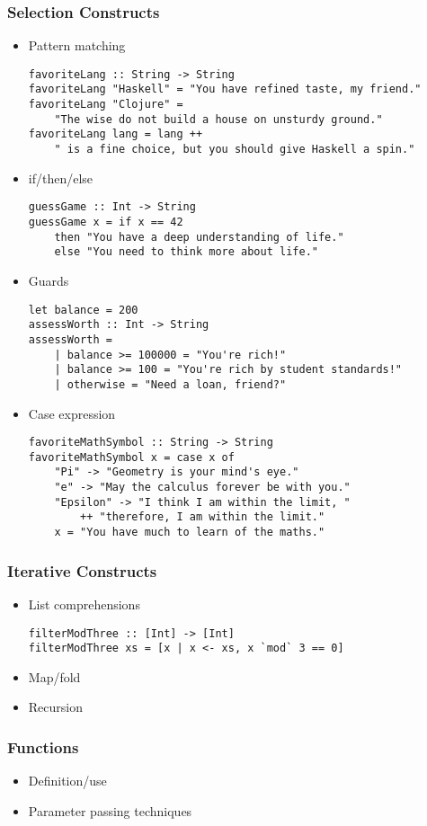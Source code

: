\documentclass[titlepage,12pt]{article}
\newcommand{\bi}{\begin{itemize}}
\newcommand{\ei}{\end{itemize}}
\begin{document}
\subsubsection{Selection Constructs}
\bi
    \item Pattern matching
\begin{verbatim}
favoriteLang :: String -> String
favoriteLang "Haskell" = "You have refined taste, my friend."
favoriteLang "Clojure" = 
    "The wise do not build a house on unsturdy ground."
favoriteLang lang = lang ++ 
    " is a fine choice, but you should give Haskell a spin."
\end{verbatim}
    \item if/then/else
\begin{verbatim}
guessGame :: Int -> String
guessGame x = if x == 42
    then "You have a deep understanding of life."
    else "You need to think more about life."
\end{verbatim}
    \item Guards
\begin{verbatim}
let balance = 200
assessWorth :: Int -> String
assessWorth =
    | balance >= 100000 = "You're rich!"
    | balance >= 100 = "You're rich by student standards!"
    | otherwise = "Need a loan, friend?"
\end{verbatim}
    \item Case expression
\begin{verbatim}
favoriteMathSymbol :: String -> String
favoriteMathSymbol x = case x of
    "Pi" -> "Geometry is your mind's eye."
    "e" -> "May the calculus forever be with you."
    "Epsilon" -> "I think I am within the limit, "
        ++ "therefore, I am within the limit."
    x = "You have much to learn of the maths."
\end{verbatim}
\ei

\subsubsection{Iterative Constructs}
\bi
    \item List comprehensions
\begin{verbatim}
filterModThree :: [Int] -> [Int]
filterModThree xs = [x | x <- xs, x `mod` 3 == 0]
\end{verbatim}
    \item Map/fold
    \item Recursion
\ei

\subsubsection{Functions}
\bi
    \item Definition/use
    \item Parameter passing techniques
\ei
\end{document}
